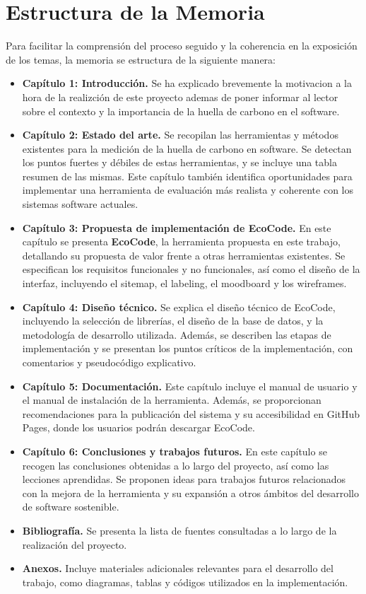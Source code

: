 \documentclass[12pt,a4paper]{report}
\begin{document}
\section{Estructura de la Memoria}

Para facilitar la comprensión del proceso seguido y la coherencia en la
exposición de los temas, la memoria se estructura de la siguiente manera:

\begin{itemize}
  \item \textbf{Capítulo 1: Introducción.} Se ha explicado brevemente la motivacion a la hora de la realizción de este proyecto ademas de poner informar al lector sobre el contexto y la importancia de la huella
        de carbono en el software.
  \item \textbf{Capítulo 2: Estado del arte.} Se recopilan las herramientas y métodos existentes para la medición de la huella de carbono en software. Se detectan los puntos fuertes y débiles de estas herramientas, y se incluye una tabla resumen de las mismas. Este capítulo también identifica oportunidades para implementar una herramienta de evaluación más realista y coherente con los sistemas software actuales.
  \item \textbf{Capítulo 3: Propuesta de implementación de EcoCode.} En este capítulo se presenta \textbf{EcoCode}, la herramienta propuesta en este trabajo, detallando su propuesta de valor frente a otras herramientas existentes. Se especifican los requisitos funcionales y no funcionales, así como el diseño de la interfaz, incluyendo el sitemap, el labeling, el moodboard y los wireframes.
  \item \textbf{Capítulo 4: Diseño técnico.} Se explica el diseño técnico de EcoCode, incluyendo la selección de librerías, el diseño de la base de datos, y la metodología de desarrollo utilizada. Además, se describen las etapas de implementación y se presentan los puntos críticos de la implementación, con comentarios y pseudocódigo explicativo.
  \item \textbf{Capítulo 5: Documentación.} Este capítulo incluye el manual de usuario y el manual de instalación de la herramienta. Además, se proporcionan recomendaciones para la publicación del sistema y su accesibilidad en GitHub Pages, donde los usuarios podrán descargar EcoCode.
  \item \textbf{Capítulo 6: Conclusiones y trabajos futuros.} En este capítulo se recogen las conclusiones obtenidas a lo largo del proyecto, así como las lecciones aprendidas. Se proponen ideas para trabajos futuros relacionados con la mejora de la herramienta y su expansión a otros ámbitos del desarrollo de software sostenible.
  \item \textbf{Bibliografía.} Se presenta la lista de fuentes consultadas a lo largo de la realización del proyecto.
  \item \textbf{Anexos.} Incluye materiales adicionales relevantes para el desarrollo del trabajo, como diagramas, tablas y códigos utilizados en la implementación.
\end{itemize}
\end{document}
